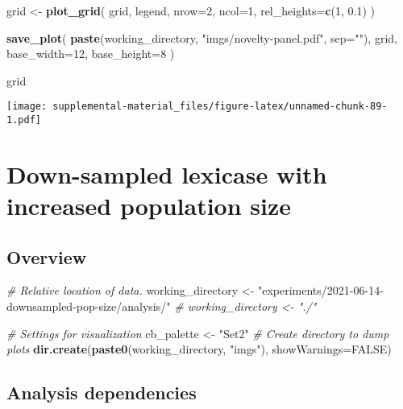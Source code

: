 \documentclass[]{book}
\newenvironment{Shaded}{\begin{snugshade}}{\end{snugshade}}
\newcommand{\CommentTok}[1]{\textcolor[rgb]{0.56,0.35,0.01}{\textit{#1}}}
\newcommand{\DataTypeTok}[1]{\textcolor[rgb]{0.13,0.29,0.53}{#1}}
\newcommand{\DecValTok}[1]{\textcolor[rgb]{0.00,0.00,0.81}{#1}}
\newcommand{\FloatTok}[1]{\textcolor[rgb]{0.00,0.00,0.81}{#1}}
\newcommand{\KeywordTok}[1]{\textcolor[rgb]{0.13,0.29,0.53}{\textbf{#1}}}
\newcommand{\NormalTok}[1]{#1}
\newcommand{\OtherTok}[1]{\textcolor[rgb]{0.56,0.35,0.01}{#1}}
\newcommand{\StringTok}[1]{\textcolor[rgb]{0.31,0.60,0.02}{#1}}
\begin{document}
\begin{Shaded}
\begin{Highlighting}[]
\NormalTok{grid <-}\StringTok{ }\KeywordTok{plot_grid}\NormalTok{(}
\NormalTok{  grid,}
\NormalTok{  legend,}
  \DataTypeTok{nrow=}\DecValTok{2}\NormalTok{,}
  \DataTypeTok{ncol=}\DecValTok{1}\NormalTok{,}
  \DataTypeTok{rel_heights=}\KeywordTok{c}\NormalTok{(}\DecValTok{1}\NormalTok{, }\FloatTok{0.1}\NormalTok{)}
\NormalTok{)}

\KeywordTok{save_plot}\NormalTok{(}
  \KeywordTok{paste}\NormalTok{(working_directory, }\StringTok{"imgs/novelty-panel.pdf"}\NormalTok{, }\DataTypeTok{sep=}\StringTok{""}\NormalTok{),}
\NormalTok{  grid,}
  \DataTypeTok{base_width=}\DecValTok{12}\NormalTok{,}
  \DataTypeTok{base_height=}\DecValTok{8}
\NormalTok{)}

\NormalTok{grid}
\end{Highlighting}
\end{Shaded}

\texttt{[image: supplemental-material\_files/figure-latex/unnamed-chunk-89-1.pdf]}

\hypertarget{down-sampled-lexicase-with-increased-population-size}{%
\chapter{Down-sampled lexicase with increased population size}\label{down-sampled-lexicase-with-increased-population-size}}

\hypertarget{overview-8}{%
\section{Overview}\label{overview-8}}

\begin{Shaded}
\begin{Highlighting}[]
\CommentTok{# Relative location of data.}
\NormalTok{working_directory <-}\StringTok{ "experiments/2021-06-14-downsampled-pop-size/analysis/"}
\CommentTok{# working_directory <- "./"}

\CommentTok{# Settings for visualization}
\NormalTok{cb_palette <-}\StringTok{ "Set2"}
\CommentTok{# Create directory to dump plots}
\KeywordTok{dir.create}\NormalTok{(}\KeywordTok{paste0}\NormalTok{(working_directory, }\StringTok{"imgs"}\NormalTok{), }\DataTypeTok{showWarnings=}\OtherTok{FALSE}\NormalTok{)}
\end{Highlighting}
\end{Shaded}

\hypertarget{analysis-dependencies-8}{%
\section{Analysis dependencies}\label{analysis-dependencies-8}}
\end{document}
